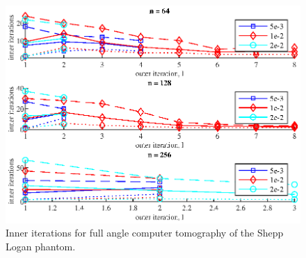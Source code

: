 \begin{figure}[htbp]
\begin{center}
\includegraphics{figures/shepp_logan_inner_its}
\caption{Inner iterations for full angle computer tomography of the Shepp Logan phantom.}
\label{fig:shepp_logan_inner_its}
\end{center}
\end{figure}

